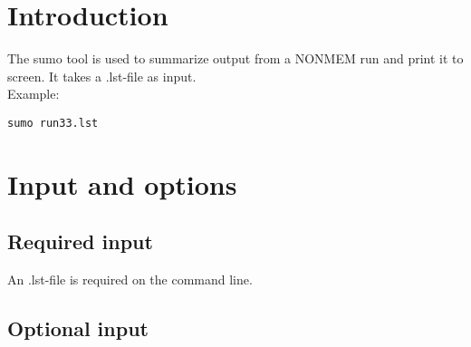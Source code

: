 
\setlength{\evensidemargin}{0pt}
\setlength{\oddsidemargin}{0pt}

\usepackage{hyperref}


\maketitle
\tableofcontents
\newpage

\section{Introduction}
The sumo tool is used to summarize output from a NONMEM run and print it to screen. It takes a .lst-file as input.\\
Example:
\begin{verbatim}
sumo run33.lst
\end{verbatim}

\section{Input and options}

\subsection{Required input}
An .lst-file is required on the command line.

\subsection{Optional input}

